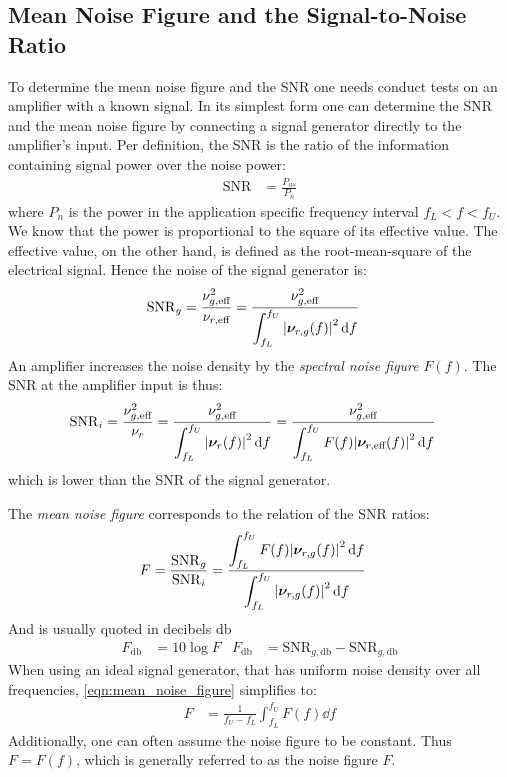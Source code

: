 \subsection{Mean Noise Figure and the Signal-to-Noise Ratio}
To determine the mean noise figure and the \acf{SNR} one needs conduct tests on an amplifier with a known signal. In its simplest form one can determine the \ac{SNR} and the mean noise figure by connecting a signal generator directly to the amplifier's input. Per definition, the \ac{SNR} is the ratio of the information containing signal power over the noise power:
\begin{align}
  \mathrm{SNR} &= \frac{P_{us}}{P_n}
\end{align}
where $P_n$ is the power in the application specific frequency interval $f_L<f<f_U$. We know that the power is proportional to the square of its effective value. The effective value, on the other hand, is defined as the root-mean-square of the electrical signal. Hence the noise of the signal generator is:
\begin{align}
  \mathrm{SNR}_g &= \frac{\nu_{g,\text{eff}}^2}{\nu_{r,\text{eff}}} = \frac{\nu_{g,\text{eff}}^2}{\displaystyle\int_{f_L}^{f_U} \abs{\bm{\nu}_{r,g}(f)}^2 \dd{f}} \label{eqn:snr_g}
\end{align}
An amplifier increases the noise density by the \emph{spectral noise figure} $F(f)$. The \ac{SNR} at the amplifier input is thus:
\begin{align}
  \mathrm{SNR}_i &= \frac{\nu_{g,\text{eff}}^2}{\nu_r} = \frac{\nu_{g,\text{eff}}^2}{\displaystyle\int_{f_L}^{f_U} \abs{\bm{\nu}_r(f)}^2 \dd{f}} = \frac{\nu_{g,\text{eff}}^2}{\displaystyle\int_{f_L}^{f_U} F(f)\abs{\bm{\nu}_{r,\text{eff}}(f)}^2 \dd{f}} \label{eqn:snr_i}
\end{align}
which is lower than the \ac{SNR} of the signal generator.

The \emph{mean noise figure} corresponds to the relation of the \ac{SNR} ratios:
\begin{align}
  F &= \frac{\mathrm{SNR}_g}{\mathrm{SNR}_i} = \frac{\displaystyle \int_{f_L}^{f_U} F(f)\abs{\bm{\nu}_{r,g}(f)}^2 \dd{f}}{\displaystyle \int_{f_L}^{f_U} \abs{\bm{\nu}_{r,g}(f)}^2 \dd{f}} \label{eqn:mean_noise_figure}
\end{align}
And is usually quoted in decibels \si{\decibel}
\begin{align}
  F_{\si{\decibel}} &= 10\log F &F_{\si{\decibel}} &= \mathrm{SNR}_{g,\si{\decibel}} - \mathrm{SNR}_{g,\si{\decibel}}
\end{align}
When using an ideal signal generator, that has uniform noise density over all frequencies, \eqref{eqn:mean_noise_figure} simplifies to:
\begin{align}
  F &= \frac{1}{f_U-f_L}\int_{f_L}^{f_U} F(f)\dd{f}
\end{align}
Additionally, one can often assume the noise figure to be constant. Thus $F=F(f)$, which is generally referred to as the noise figure $F$.

